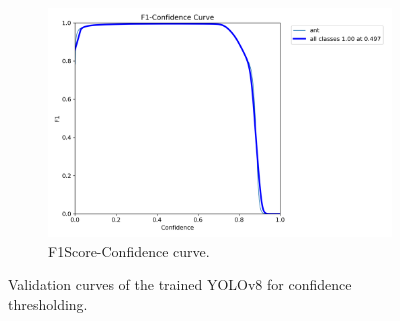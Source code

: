 \begin{figure}[!p]
    \begin{subfigure}[]{0.45\textwidth}
        \centering
		\includegraphics[width=\textwidth]{figures/06_results/F1_curveDetector.png}
        \caption[F1Score-Confidence curve of YOLOv8]{\footnotesize{F1Score-Confidence curve.}}
        \label{fig:detector_f1score}
	\end{subfigure}
	
	\caption[YOLOv8: Precision, Recall and F1Score-Confidence curve]{\footnotesize{Validation curves of the trained YOLOv8 for confidence thresholding.}}
	\label{fig:detector_precision_recall_f1}
\end{figure}
